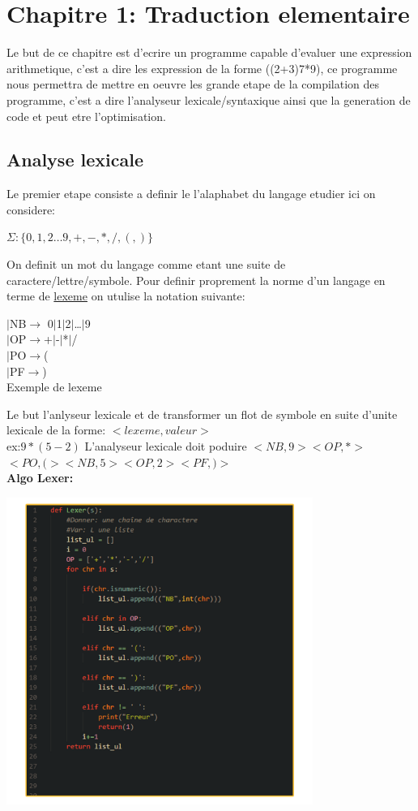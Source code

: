 \documentclass[a4paper,11pt]{article}
\begin{document}
  \section{\color{OrangeHaf}Chapitre 1: Traduction elementaire}
  Le but de ce chapitre est d'ecrire un programme capable d'evaluer une expression arithmetique, c'est a dire les expression de la forme ((2+3)7*9), ce programme nous permettra de mettre en oeuvre les grande etape de la compilation des programme, c'est a dire l'analyseur lexicale/syntaxique ainsi que la generation de code et peut etre l'optimisation.
  \subsection{Analyse lexicale}
      Le premier etape consiste a definir le l'alaphabet du langage etudier ici on considere:\\
      \begin{center}
        $\Sigma :\{0,1,2\ldots9,+,-,*,/,(,)\}$
      \end{center}
      On definit un mot du langage comme etant une suite de caractere/lettre/symbole. Pour definir proprement la norme d'un langage en terme de \underline{lexeme} on utulise la notation suivante:
      \begin{flushleft}
        $\vert$NB$\rightarrow$ 0$\vert$1$\vert$2$\vert$\ldots$\vert$9\\
        $\vert$OP$\rightarrow$+$\vert$-$\vert$*$\vert$/\\
        $\vert$PO$\rightarrow$(\\
        $\vert$PF$\rightarrow$)\\
        Exemple de lexeme
      \end{flushleft}
      Le but l'anlyseur lexicale et de transformer un flot de symbole en suite d'unite lexicale de la forme: $<lexeme,valeur>$\\
      ex:$9*(5-2)$
      L'analyseur lexicale doit poduire $<NB,9>$$<OP,*>$$<PO,(>$$<NB,5>$$<OP,2>$$<PF,)>$\\
      \textbf{Algo Lexer:}
      \begin{center}
     \hfill\includegraphics[width=10cm]{Lexer.png}\hspace*{\fill}
      \end{center}
\end{document}
